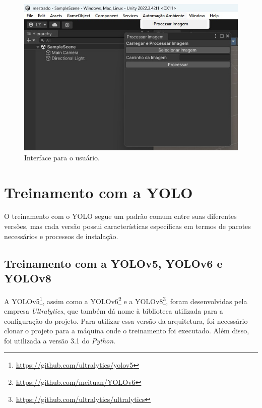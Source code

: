\begin{figure}[!h]
    \centering
    \begin{minipage}{0.7\linewidth}
        \centering
        \captionsetup{justification=centering,margin=0.5cm,font=small}
        \includegraphics[width=\linewidth]{img/cap5/GUI-TOOL.jpeg}
        \caption{Interface para o usuário.}
        \label{fig:GUI}
    \end{minipage}
\end{figure}

\section{Treinamento com a YOLO}

O treinamento com o YOLO segue um padrão comum entre suas diferentes versões, mas cada versão possui características específicas em termos de pacotes necessários e processos de instalação. 

\subsection{Treinamento com a YOLOv5, YOLOv6 e YOLOv8}

A YOLOv5\footnote{\url{https://github.com/ultralytics/yolov5}}, assim como a YOLOv6\footnote{\url{https://github.com/meituan/YOLOv6}} e a YOLOv8\footnote{\url{https://github.com/ultralytics/ultralytics}}, foram desenvolvidas pela empresa \textit{Ultralytics}, que também dá nome à biblioteca utilizada para a configuração do projeto. Para utilizar essa versão da arquitetura, foi necessário clonar o projeto para a máquina onde o treinamento foi executado. Além disso, foi utilizada a versão 3.1 do \textit{Python}.

